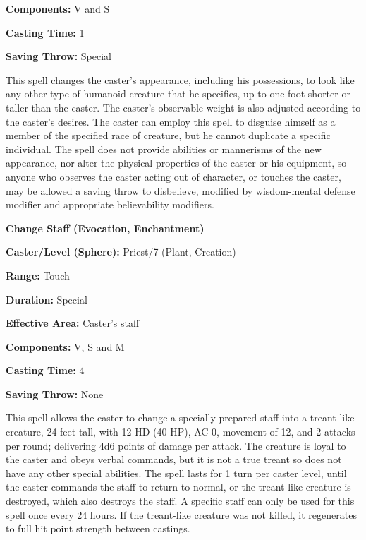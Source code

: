 \begin{multicols}{2}
\begin{minipage}{\columnwidth}
\noindent \textbf{Components:} V and S

\noindent \textbf{Casting Time:} 1

\noindent \textbf{Saving Throw:} Special

\end{minipage}

This spell changes the caster's appearance, including his possessions, to look like any other type of humanoid creature that he specifies, up to one foot shorter or taller than the caster.  The caster's observable weight is also adjusted according to the caster's desires.  The caster can employ this spell to disguise himself as a member of the specified race of creature, but he cannot duplicate a specific individual.  The spell does not provide abilities or mannerisms of the new appearance, nor alter the physical properties of the caster or his equipment, so anyone who observes the caster acting out of character, or touches the caster, may be allowed a saving throw to disbelieve, modified by wisdom-mental defense modifier and appropriate believability modifiers.

\vspace{1em}

\noindent
\begin{minipage}{\columnwidth}

\noindent \textbf{Change Staff (Evocation, Enchantment)}

\noindent \textbf{Caster/Level (Sphere):} Priest/7 (Plant, Creation)

\noindent \textbf{Range:} Touch

\noindent \textbf{Duration:} Special

\noindent \textbf{Effective Area:} Caster's staff

\noindent \textbf{Components:} V, S and M

\noindent \textbf{Casting Time:} 4

\noindent \textbf{Saving Throw:} None

\end{minipage}

This spell allows the caster to change a specially prepared staff into a treant-like creature, 24-feet tall, with 12 HD (40 HP), AC 0, movement of 12, and 2 attacks per round; delivering 4d6 points of damage per attack.  The creature is loyal to the caster and obeys verbal commands, but it is not a true treant so does not have any other special abilities.  The spell lasts for 1 turn per caster level, until the caster commands the staff to return to normal, or the treant-like creature is destroyed, which also destroys the staff.  A specific staff can only be used for this spell once every 24 hours.  If the treant-like creature was not killed, it regenerates to full hit point strength between castings.


\end{multicols}
